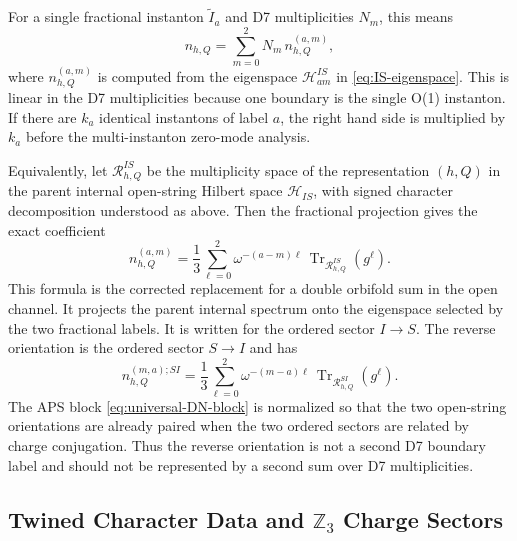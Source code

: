 \documentclass[11pt]{article}
\newcommand{\Z}{\mathbb{Z}}
\newcommand{\cH}{\mathcal{H}}
\newcommand{\Tr}{\operatorname{Tr}}
\newcommand{\wt}{\widetilde}
\begin{document}
For a single fractional instanton $\wt I_a$ and D7 multiplicities $N_m$, this means
\begin{equation}
  n_{h,Q}
  =
  \sum_{m=0}^{2} N_m\, n_{h,Q}^{(a,m)},
  \label{eq:multiplicity-sum}
\end{equation}
where $n_{h,Q}^{(a,m)}$ is computed from the eigenspace
$\cH_{a m}^{I S}$ in \eqref{eq:IS-eigenspace}. This is linear in the D7 multiplicities because
one boundary is the single O(1) instanton. If there are $k_a$ identical instantons of label
$a$, the right hand side is multiplied by $k_a$ before the multi-instanton zero-mode analysis.

Equivalently, let $\mathcal R_{h,Q}^{I S}$ be the multiplicity space of the representation
$(h,Q)$ in the parent internal open-string Hilbert space $\cH_{I S}$, with signed character
decomposition understood as above. Then the fractional projection gives the exact coefficient
\begin{equation}
  n_{h,Q}^{(a,m)}
  =
  \frac{1}{3}
  \sum_{\ell=0}^{2}
  \omega^{-(a-m)\ell}\,
  \Tr_{\mathcal R_{h,Q}^{I S}}\!\left(g^\ell\right).
  \label{eq:DN-projection-coefficient}
\end{equation}
This formula is the corrected replacement for a double orbifold sum in the open channel. It
projects the parent internal spectrum onto the eigenspace selected by the two fractional labels.
It is written for the ordered sector $I\to S$. The reverse orientation is the ordered sector
$S\to I$ and has
\begin{equation}
  n_{h,Q}^{(m,a);S I}
  =
  \frac{1}{3}
  \sum_{\ell=0}^{2}
  \omega^{-(m-a)\ell}\,
  \Tr_{\mathcal R_{h,Q}^{S I}}\!\left(g^\ell\right).
  \label{eq:reverse-DN-projection}
\end{equation}
The APS block \eqref{eq:universal-DN-block} is normalized so that the two open-string
orientations are already paired when the two ordered sectors are related by charge conjugation.
Thus the reverse orientation is not a second D7 boundary label and should not be represented by a
second sum over D7 multiplicities.

\subsection{Twined Character Data and \texorpdfstring{$\Z_3$}{Z3} Charge Sectors}
\end{document}
